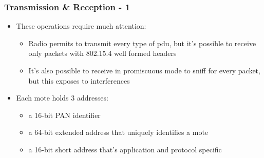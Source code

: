 \begin{frame}[fragile]
  \frametitle{Transmission \& Reception - 1}
  \begin{itemize}
    \item These operations require much attention:
    \begin{itemize}
    	\item Radio permits to transmit every type of pdu, but it's possible to receive only packets with 802.15.4 well formed headers
    	\item It's also possible to receive in promiscuous mode to sniff for every packet, but this exposes to interferences
    \end{itemize}
    \item Each mote holds 3 addresses:
    \begin{itemize}
    	\item a 16-bit PAN identifier
    	\item a 64-bit extended address that uniquely identifies a mote
    	\item a 16-bit short address that's application and protocol specific
    \end{itemize}
  \end{itemize}
\end{frame}

